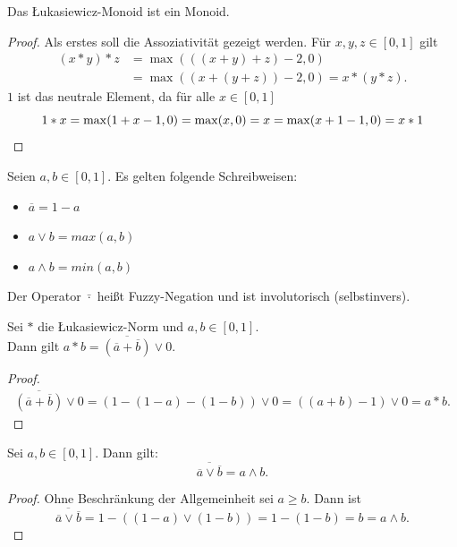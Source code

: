 \documentclass{article}
\begin{document}
\begin{theorem}
  Das Łukasiewicz-Monoid ist ein Monoid.
\end{theorem}
\begin{proof}
  Als erstes soll die Assoziativität gezeigt werden.
  Für $x, y, z \in [0, 1]$ gilt
  \begin{align*}
    (x \ast y) \ast z &= \max(((x + y) + z) - 2, 0) \\
    &= \max((x + (y + z)) - 2, 0) = x \ast (y \ast z).
  \end{align*}
  $1$ ist das neutrale Element, da für alle $x \in [0, 1]$
  \begin{equation*}
    1 \ast x = \max(1 + x - 1, 0) = \max(x, 0) = x = \max(x + 1 - 1, 0) = x \ast 1 \qedhere
  \end{equation*}
\end{proof}

\begin{definition}
  Seien $a, b \in [0, 1]$. Es gelten folgende Schreibweisen:
  \begin{itemize}
    \item $\overline{a} = 1 - a$
    \item $a \vee b = max(a, b)$
    \item $a \wedge b = min(a, b)$
  \end{itemize}
  Der Operator $\bar{\cdot}$ heißt Fuzzy-Negation und ist involutorisch (selbstinvers).
\end{definition}

\begin{theorem}
  Sei $\ast$ die Łukasiewicz-Norm und $a, b \in [0, 1]$. \\
  Dann gilt $a \ast b = \overline{(\overline{a} + \overline{b})} \vee 0$.
\end{theorem}
\begin{proof}
  \begin{align*}
    \overline{(\overline{a} + \overline{b})} \vee 0 = (1 - (1 - a) - (1 - b)) \vee 0 = ((a+b) - 1 )\vee 0 = a \ast b.
  \end{align*}
\end{proof}

\begin{theorem}
  Sei $a, b \in [0, 1]$.
  Dann gilt:
  \begin{equation*}
    \overline{\overline{a} \vee \overline{b}} = a \wedge b.
  \end{equation*}
\end{theorem}
\begin{proof}
  Ohne Beschränkung der Allgemeinheit sei $a \geq b$.
  Dann ist 
  \begin{equation*}
    \overline{\overline{a} \vee \overline{b}} = 1 - ((1 - a) \vee (1 - b)) = 1 - (1 - b) = b = a \wedge b.
  \end{equation*}
\end{proof}
\end{document}
